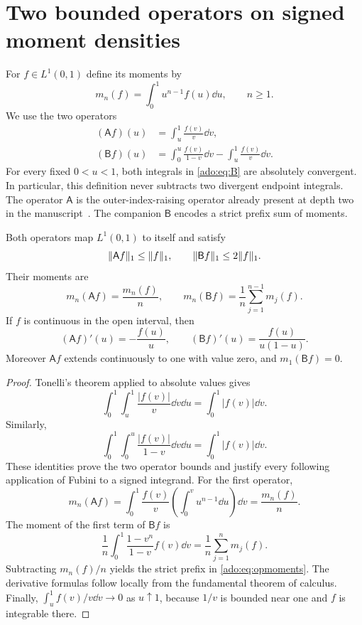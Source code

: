 \section{Two bounded operators on signed moment densities}
\label{ado:sec:operators}
For $f\in L^1(0,1)$ define its moments by
\[
 m_n(f)=\int_0^1u^{n-1}f(u)\dd u,\qquad n\ge1.
\]
We use the two operators
\begin{align}
 (\mathsf{A} f)(u)&=\int_u^1\frac{f(v)}v\dd v,
 \label{ado:eq:A}\\
 (\mathsf{B} f)(u)&=\int_0^u\frac{f(v)}{1-v}\dd v
              -\int_u^1\frac{f(v)}v\dd v.
 \label{ado:eq:B}
\end{align}
For every fixed $0<u<1$, both integrals in \eqref{ado:eq:B} are
absolutely convergent. In particular, this definition never subtracts
two divergent endpoint integrals. The operator $\mathsf{A}$ is the
outer-index-raising operator already present at depth two in the
manuscript~\cite{ado:report}. The companion $\mathsf{B}$ encodes a strict
prefix sum of moments.

\begin{lemma}
\label{ado:lem:operators}
Both operators map $L^1(0,1)$ to itself and satisfy
\begin{equation}\label{ado:eq:opnorm}
 \lVert\mathsf{A} f\rVert_1\le\lVert f\rVert_1,\qquad
 \lVert\mathsf{B} f\rVert_1\le2\lVert f\rVert_1.
\end{equation}
Their moments are
\begin{equation}\label{ado:eq:opmoments}
 m_n(\mathsf{A} f)=\frac{m_n(f)}n,\qquad
 m_n(\mathsf{B} f)=\frac1n\sum_{j=1}^{n-1}m_j(f).
\end{equation}
If $f$ is continuous in the open interval, then
\begin{equation}\label{ado:eq:opderivatives}
 (\mathsf{A} f)'(u)=-\frac{f(u)}u,\qquad
 (\mathsf{B} f)'(u)=\frac{f(u)}{u(1-u)}.
\end{equation}
Moreover $\mathsf{A} f$ extends continuously to one with value zero, and
$m_1(\mathsf{B} f)=0$.
\end{lemma}
\begin{proof}
Tonelli's theorem applied to absolute values gives
\[
 \int_0^1\int_u^1\frac{|f(v)|}{v}\dd v\dd u
 =\int_0^1|f(v)|\dd v.
\]
Similarly,
\[
 \int_0^1\int_0^u\frac{|f(v)|}{1-v}\dd v\dd u
 =\int_0^1|f(v)|\dd v.
\]
These identities prove the two operator bounds and justify every
following application of Fubini to a signed integrand. For the first
operator,
\[
 m_n(\mathsf{A} f)=\int_0^1\frac{f(v)}v
       \left(\int_0^v u^{n-1}\dd u\right)\dd v
 =\frac{m_n(f)}n.
\]
The moment of the first term of $\mathsf{B} f$ is
\[
 \frac1n\int_0^1\frac{1-v^n}{1-v}f(v)\dd v
 =\frac1n\sum_{j=1}^n m_j(f).
\]
Subtracting $m_n(f)/n$ yields the strict prefix in
\eqref{ado:eq:opmoments}. The derivative formulas follow locally from
the fundamental theorem of calculus. Finally,
$\int_u^1f(v)/v\dd v\to0$ as $u\uparrow1$, because $1/v$ is bounded
near one and $f$ is integrable there.
\end{proof}

